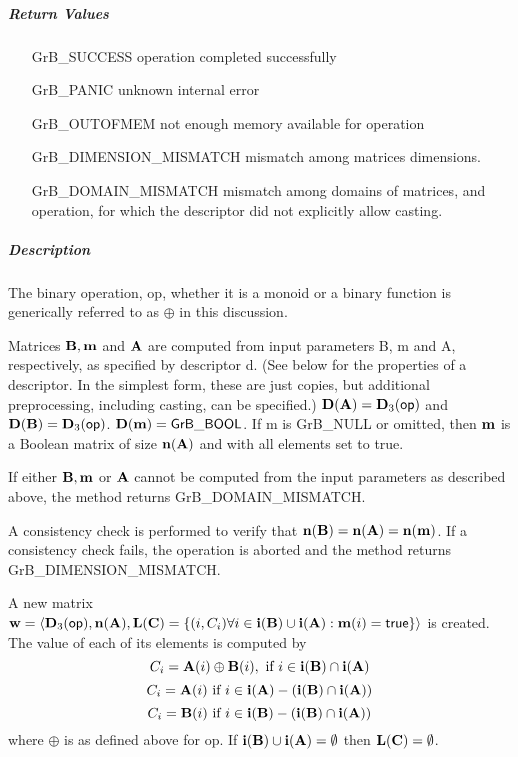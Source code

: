 \subparagraph{Return Values}

\begin{itemize}[leftmargin=2.1in]
    \item[{\sf GrB\_SUCCESS}]             operation completed successfully
    \item[{\sf GrB\_PANIC}]               unknown internal error
    \item[{\sf GrB\_OUTOFMEM}]            not enough memory available for operation
    \item[{\sf GrB\_DIMENSION\_MISMATCH}] mismatch among matrices dimensions.
    \item[{\sf GrB\_DOMAIN\_MISMATCH}]    mismatch among domains of matrices, and operation, for which the descriptor did not explicitly allow casting.
\end{itemize}

\subparagraph{Description}


The binary operation, {\sf op}, whether it is a monoid or a binary function
is generically referred to as $\oplus$ in this discussion.

Matrices ${\bf B}, {\bf m}$ and ${\bf A}$ are computed from
input parameters {\sf B}, {\sf m} and {\sf A}, respectively, as specified
by descriptor {\sf d}. (See below for the properties of a descriptor. In
the simplest form, these are just copies, but additional preprocessing,
including casting, can be specified.)  $\bold{D}({\bf A}) =
\bold{D}_3({\sf op})$ and $\bold{D}({\bf B}) = \bold{D}_3({\sf op})$.
$\bold{D}({\bf m}) = {\sf GrB\_BOOL}$.  If {\sf m} is {\sf GrB\_NULL} or omitted,
then ${\bf m}$ is a Boolean matrix of size $\bold{n}({\bf A})$
and with all elements set to {\sf true}.

If either ${\bf B}, {\bf m}$ or ${\bf A}$ cannot be computed
from the input parameters as described above, the method returns {\sf
    GrB\_DOMAIN\_MISMATCH}.

A consistency check is performed to verify that $\bold{n}({\bf B})
= \bold{n}({\bf A}) = \bold{n}({\bf m})$. If a consistency check fails, the operation is
aborted and the method returns {\sf GrB\_DIMENSION\_MISMATCH}.

A new matrix ${\bf w} = \langle \bold{D}_3({\sf op}),
\bold{n}({\bf A}), \bold{L}({\bf C}) = \{(i,C_i)  \forall i \in
{\bf i}({\bf B}) \cup {\bf i}({\bf A}) : {\bf m}(i)
= {\sf true} \} \rangle$ is created.  The value of each of its
elements is computed by 
\[
C_i = {\bf A}(i) \oplus {\bf B}(i), \ \mbox{if}\  i \in  {\bf i}({\bf B}) \cap {\bf i}({\bf A})
\]
\[
C_i = {\bf A}(i) \ \mbox{if}\  i \in  {\bf i}({\bf A}) - ({\bf i}({\bf B}) \cap {\bf i}({\bf A}))
\]
\[
C_i = {\bf B}(i) \ \mbox{if}\  i \in  {\bf i}({\bf B}) - ({\bf i}({\bf B}) \cap {\bf i}({\bf A}))
\]
where $\oplus$ is as defined above for {\sf op}.
If ${\bf i}({\bf B}) \cup {\bf i}({\bf A}) = \emptyset$
then $\bold{L}({\bf C}) = \emptyset$.

